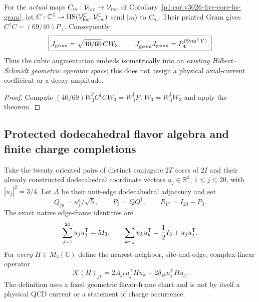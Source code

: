 \documentclass[11pt]{article}
\begin{document}
\begin{corollary}
\label{p1b:cor:v369-five-core-operator-cubic}
For the \emph{actual} maps $C_m:\mathcal V_{\rm loc}\to
\mathcal V_{\rm rec}$ of Corollary~\ref{p1:cor:v3026-five-core-hs-gram},
let $C:\mathbb C^5\to\operatorname{HS}(\mathcal V_{\rm loc}^{\mathbb C},
\mathcal V_{\rm rec}^{\mathbb C})$ send $|m\rangle$ to $C_m$.
Their printed Gram gives $C^\dagger C=(69/40)P_\perp$.
Consequently
\[
 \boxed{J_{\rm geom}=\sqrt{40/69}\,CW_3,\qquad
 J_{\rm geom}^\dagger J_{\rm geom}
 =P_{\mathbf4}^{(\operatorname{Sym}^3V)}.}
\]
Thus the cubic augmentation embeds isometrically into an \emph{existing
Hilbert--Schmidt geometric operator space}; this does not assign a
physical axial-current coefficient or a decay amplitude.
\end{corollary}
\begin{proof}
Compute $(40/69)W_3^\dagger C^\dagger CW_3
=W_3^\dagger P_\perp W_3=W_3^\dagger W_3$ and apply the theorem.
\end{proof}

\subsection{Protected dodecahedral flavor algebra and finite charge completions}
\label{p1b:sec:fullcarrier-flavor-completion}

\begin{definition}
\label{p1b:def:fullcarrier-corepair-flavor-lift}
Take the twenty oriented pairs of distinct conjugate $2T$ cores of
$2I$ and their already constructed dodecahedral coordinate vectors
$u_j\in\mathbb R^3$, $1\le j\le20$, with $|u_j|^2=3/4$.
Let $A$ be their unit-edge dodecahedral adjacency and set
\[
 Q_{ja}=u_j^a/\sqrt5,\qquad P_3=QQ^\dagger,\qquad R_{17}=I_{20}-P_3.
\]
The exact native edge-frame identities are
\[
 \sum_{j=1}^{20}u_ju_j^{\mathsf T}=5I_3,\qquad
 \sum_{k\sim j}u_ku_k^{\mathsf T}={1\over2}I_3+u_ju_j^{\mathsf T}.
\]
For \emph{every} $H\in M_3(\mathbb C)$ define the nearest-neighbor,
site-and-edge, complex-linear operator
\[
 \boxed{\mathscr K(H)_{jk}=2A_{jk}u_j^{\mathsf T}Hu_k
 -2\delta_{jk}u_j^{\mathsf T}Hu_j.}
\]
The definition uses a fixed geometric flavor-frame chart and is not
by itself a physical QCD current or a statement of charge occurrence.
\end{definition}
\end{document}
